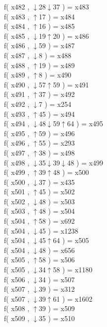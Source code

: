 f( x482 , $\downarrow$28$\downarrow$37 ) = x483 \\
f( x483 , $\uparrow$17 ) = x484 \\
f( x484 , $\uparrow$16 ) = x485 \\
f( x485 , $\downarrow$19$\uparrow$20 ) = x486 \\
f( x486 , $\downarrow$59 ) = x487 \\
f( x487 , $\downarrow$8 ) = x488 \\
f( x488 , $\uparrow$19 ) = x489 \\
f( x489 , $\uparrow$8 ) = x490 \\
f( x490 , $\downarrow$57$\uparrow$59 ) = x491 \\
f( x491 , $\uparrow$37 ) = x492 \\
f( x492 , $\downarrow$7 ) = x254 \\
f( x493 , $\uparrow$45 ) = x494 \\
f( x494 , $\downarrow$48$\downarrow$59$\uparrow$64 ) = x495 \\
f( x495 , $\uparrow$59 ) = x496 \\
f( x496 , $\uparrow$55 ) = x293 \\
f( x497 , $\uparrow$38 ) = x498 \\
f( x498 , $\downarrow$35$\downarrow$39$\downarrow$48 ) = x499 \\
f( x499 , $\uparrow$39$\uparrow$48 ) = x500 \\
f( x500 , $\downarrow$37 ) = x435 \\
f( x501 , $\uparrow$45 ) = x502 \\
f( x502 , $\downarrow$48 ) = x503 \\
f( x503 , $\uparrow$48 ) = x504 \\
f( x504 , $\uparrow$58 ) = x692 \\
f( x504 , $\downarrow$45 ) = x1238 \\
f( x504 , $\downarrow$45$\uparrow$64 ) = x505 \\
f( x504 , $\downarrow$48 ) = x656 \\
f( x505 , $\uparrow$58 ) = x506 \\
f( x505 , $\downarrow$34$\uparrow$58 ) = x1180 \\
f( x506 , $\downarrow$34 ) = x507 \\
f( x507 , $\downarrow$39 ) = x312 \\
f( x507 , $\downarrow$39$\uparrow$61 ) = x1602 \\
f( x508 , $\uparrow$39 ) = x509 \\
f( x509 , $\downarrow$35 ) = x510 \\
